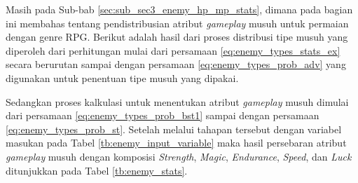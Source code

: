 Masih pada Sub-bab \ref{sec:sub_sec3_enemy_hp_mp_stats}, dimana pada bagian ini membahas tentang pendistribusian atribut \textit{gameplay} musuh untuk permaian dengan genre RPG. Berikut adalah hasil dari proses distribusi tipe musuh yang diperoleh dari perhitungan mulai dari persamaan \ref{eq:enemy_types_stats_ex} secara berurutan sampai dengan persamaan \ref{eq:enemy_types_prob_adv} yang digunakan untuk penentuan tipe musuh yang dipakai. 
\vspace{1ex}

Sedangkan proses kalkulasi untuk menentukan atribut \textit{gameplay} musuh dimulai dari persamaan \ref{eq:enemy_types_prob_bst1} sampai dengan persamaan \ref{eq:enemy_types_prob_st}. Setelah melalui tahapan tersebut dengan variabel masukan pada Tabel \ref{tb:enemy_input_variable} maka hasil persebaran atribut \textit{gameplay} musuh dengan komposisi \textit{Strength}, \textit{Magic}, \textit{Endurance}, \textit{Speed}, dan \textit{Luck} ditunjukkan pada Tabel \ref{tb:enemy_stats}.
\vspace{-1ex}

